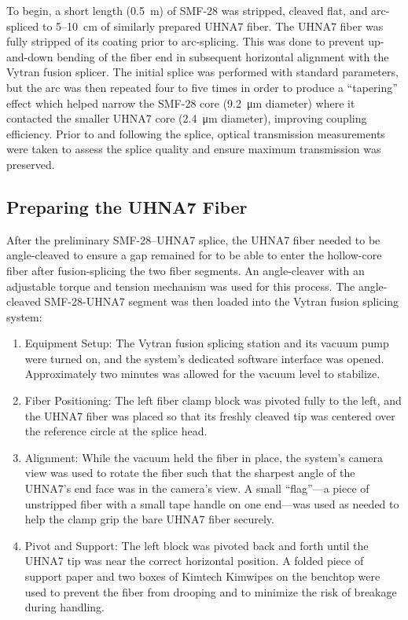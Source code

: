 To begin, a short length (\SI{0.5}{\meter}) of \ac{SMF-28} was stripped, cleaved flat, and arc-spliced to 5–\SI{10}{\centi\meter} of similarly prepared \ac{UHNA7} fiber. The \ac{UHNA7} fiber was fully stripped of its coating prior to arc-splicing. This was done to prevent up-and-down bending of the fiber end in subsequent horizontal alignment with the Vytran fusion splicer. The initial splice was performed with standard parameters, but the arc was then repeated four to five times in order to produce a “tapering” effect which helped narrow the \ac{SMF-28} core (\SI{9.2}{\micro\meter} diameter) where it contacted the smaller \ac{UHNA7} core (\SI{2.4}{\micro\meter} diameter), improving coupling efficiency. Prior to and following the splice, optical transmission measurements were taken to assess the splice quality and ensure maximum transmission was preserved.

\subsection{Preparing the \acs{UHNA7} Fiber}

After the preliminary \ac{SMF-28}–\ac{UHNA7} splice, the \ac{UHNA7} fiber needed to be angle-cleaved to ensure a gap remained for  to be able to enter the hollow-core fiber after fusion-splicing the two fiber segments. An angle-cleaver with an adjustable torque and tension mechanism was used for this process. The angle-cleaved \ac{SMF-28}-\ac{UHNA7} segment was then loaded into the Vytran fusion splicing system:

\begin{enumerate}
	\item Equipment Setup: The Vytran fusion splicing station and its vacuum pump were turned on, and the system’s dedicated software interface was opened. Approximately two minutes was allowed for the vacuum level to stabilize.
	\item Fiber Positioning: The left fiber clamp block was pivoted fully to the left, and the \ac{UHNA7} fiber was placed so that its freshly cleaved tip was centered over the reference circle at the splice head.
	\item Alignment: While the vacuum held the fiber in place, the system’s camera view was used to rotate the fiber such that the sharpest angle of the \ac{UHNA7}’s end face was in the camera's view. A small “flag”—a piece of unstripped fiber with a small tape handle on one end—was used as needed to help the clamp grip the bare \ac{UHNA7} fiber securely.
	\item Pivot and Support: The left block was pivoted back and forth until the \ac{UHNA7} tip was near the correct horizontal position. A folded piece of support paper and two boxes of Kimtech Kimwipes on the benchtop were used to prevent the fiber from drooping and to minimize the risk of breakage during handling.
\end{enumerate}

